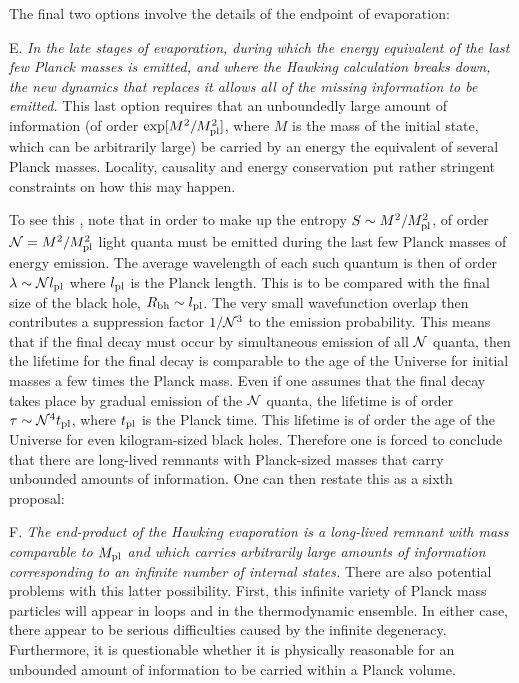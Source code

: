 The final two options involve the details of the endpoint of evaporation:

\itemskip
\item{E.}  {\it In the late stages of evaporation, during which the energy
equivalent of the last
few Planck masses is emitted, and where the Hawking calculation breaks down,
the new dynamics that replaces it
allows all of the missing information to be
emitted. }
\itemskip
This last option requires that an unboundedly large amount of
information (of order $\exp[{M^2/M_{\rm pl}^2}]$, where $M$
is the mass of the
initial state, which can be arbitrarily large) be
carried by an energy the equivalent of several Planck
masses.  Locality, causality and energy conservation put rather
stringent constraints on how this may happen.

To see this , note that in order to make up the entropy
$S\sim M^2/M_{\rm pl}^2$, of order ${\cal N} = M^2/M_{\rm pl}^2$ light quanta must
be emitted during the last few Planck masses of energy emission.  The
average wavelength of each such quantum is then of order $\lambda\sim
{\cal N}l_{\rm pl}$ where $l_{\rm pl}$ is the Planck length.  This is to be compared
with the final size of the black hole, $R_{\rm bh}\sim l_{\rm pl}$.  The
very small wavefunction overlap then contributes a suppression factor
$1/{\cal N}^3$ to the emission probability.  This means that if the final
decay must occur by simultaneous emission of all ${\cal N}$ quanta, then
the lifetime for the final decay is comparable to the age of the
Universe  for initial masses a few times the Planck
mass.  Even if one assumes that the final decay takes place by
gradual emission of the ${\cal N}$ quanta, the lifetime is of
order
$\tau \sim {\cal N}^4 t_{\rm pl}$, where $t_{\rm pl}$ is the Planck
time.  This lifetime is of order the age of the Universe for
even kilogram-sized black holes.
Therefore one is forced to conclude that there are long-lived
remnants with Planck-sized  masses that carry unbounded amounts of
information.  One can then restate this as a sixth proposal:

\itemskip
\item{F.}  {\it The end-product of the Hawking evaporation is a long-lived
remnant with mass comparable to $M_{\rm pl}$ and which carries arbitrarily
large amounts of information corresponding to an infinite number
of internal states.}
\itemskip
There are also potential problems with this latter possibility.
First, this infinite variety of Planck mass particles will appear in loops
and in the thermodynamic ensemble.  In either case, there appear to be serious
difficulties
caused by the infinite degeneracy.
Furthermore, it is questionable whether it is physically
reasonable for an unbounded amount of information to be carried
within a Planck volume.

